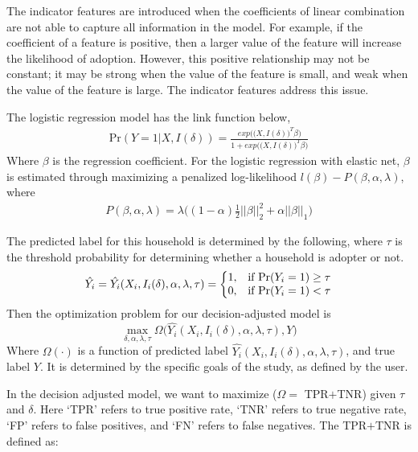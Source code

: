 The indicator features are introduced when the coefficients of linear combination are not able to
capture all information in the model. For example, if the coefficient of a feature
is positive, then a larger value of the feature will increase the
likelihood of adoption. However, this positive relationship may not be
constant; it may be strong when the value of the
feature is small, and weak when the value of the feature is
large. The indicator features address this issue.

The logistic regression model has the link function below,
\begin{align*}
\text{Pr}(Y=1|X, I(\delta))=\frac{exp\Big(\big(X, I(\delta)\big)^T\beta\Big)}{1+exp\Big(\big(X, I(\delta)\big)^T\beta\Big)}
\end{align*}
Where $\beta$ is the regression coefficient. For the logistic regression with elastic net, $\beta$ is estimated through maximizing a penalized log-likelihood $l(\beta)-P(\beta,\alpha,\lambda)$, where 
\begin{align*}
P(\beta,\alpha,\lambda)=\lambda\big((1-\alpha)\frac{1}{2}||\beta||_2^2+\alpha||\beta||_1\big)
\end{align*}


The predicted label for this household is determined by the following, where $\tau$ is the threshold probability for determining whether a household is adopter or not. 
\begin{equation*}
\hat{Y_i}=\hat{Y_i}(X_i,I_i(\delta),\alpha,\lambda,\tau)=\left\{
\begin{array}{@{}ll@{}}
1, & \text{if Pr}(Y_i=1)\ge \tau \\
0, & \text{if Pr}(Y_i=1)< \tau
\end{array}\right.
\end{equation*}
Then the optimization problem for our decision-adjusted model is
\begin{equation*}
\max_{\delta,\alpha,\lambda,\tau} \Omega\Big(\hat{Y_i}(X_i,I_i(\delta),\alpha,\lambda,\tau),Y\Big)
\end{equation*}
Where $\Omega(\cdot)$ is a function of predicted label
$\hat{Y_i}(X_i,I_i(\delta),\alpha,\lambda,\tau)$, and true label
$Y$. It is determined by the specific goals of the study, as defined
by the user. 

In the decision adjusted model, we want to maximize ($\Omega=$
TPR$+$TNR) given $\tau$ and $\delta$. Here `TPR' refers to true
positive rate, `TNR' refers to true negative rate, `FP' refers to false positives, and `FN' refers to false negatives. The TPR$+$TNR is defined as:

